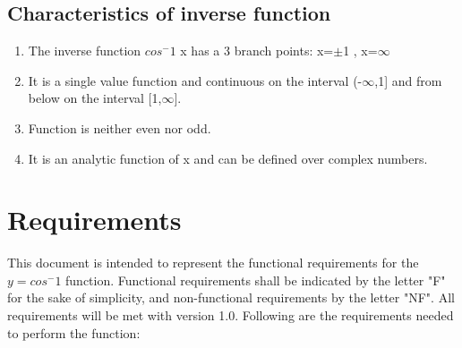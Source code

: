 \documentclass{article}
\begin{document}
    {\subsection{Characteristics of inverse function}}
    \justify
    \begin{enumerate}
        \item  The inverse function $cos^-1$ x has a 3 branch points: x=$\pm $1 , x=$\infty$
        \item It is a single value function and continuous on the interval (-$\infty$,1] and from below on the interval [1,$\infty$].
        \item Function is neither even nor odd.
        \item It is an analytic function of x and can be defined over complex numbers.
    \end{enumerate}
    \section{Requirements}
    This document is intended to represent the functional requirements for the $y = cos^-1$ function.
    Functional requirements shall be indicated by the letter "F" for the sake of simplicity, and non-functional requirements by the letter "NF". All requirements will be met with version 1.0.
    Following are the requirements needed to perform the function:
\end{document}

